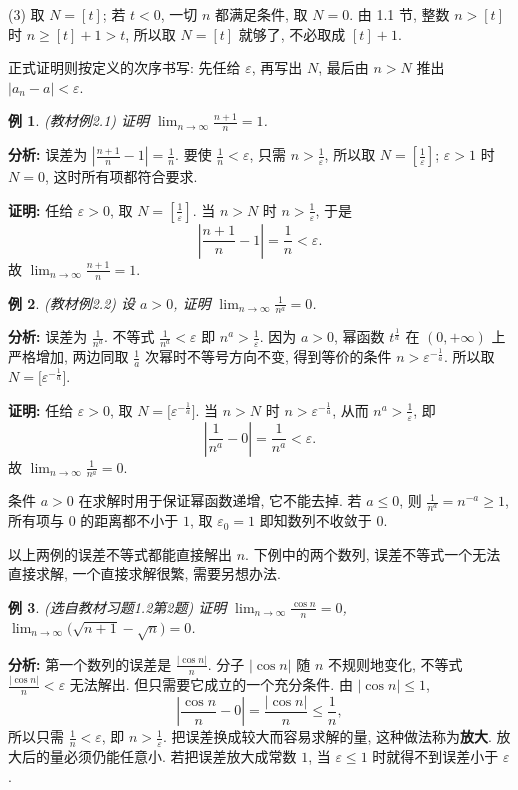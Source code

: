 \documentclass[UTF8,openany]{ctexbook}
\theoremstyle{chinesetextbook}
\newtheorem{example}{例}[section]
\newenvironment{cnproof}{\par\indent\textbf{证明:} \ignorespaces}{\par}
\begin{document}
(3) 取 $N=[t]$; 若 $t<0$, 一切 $n$ 都满足条件, 取 $N=0$. 由 1.1 节, 整数 $n>[t]$ 时 $n\ge[t]+1>t$, 所以取 $N=[t]$ 就够了, 不必取成 $[t]+1$.

正式证明则按定义的次序书写: 先任给 $\varepsilon$, 再写出 $N$, 最后由 $n>N$ 推出 $|a_n-a|<\varepsilon$.
\begin{example}\label{ex:2-1}
\textnormal{(教材例2.1)} 证明 $\displaystyle\lim_{n\to\infty}\frac{n+1}n=1$.
\end{example}
\par\indent\textbf{分析:} 误差为 $\displaystyle\left|\frac{n+1}n-1\right|=\frac1n$. 要使 $\displaystyle\frac1n<\varepsilon$, 只需 $\displaystyle n>\frac1\varepsilon$, 所以取 $\displaystyle N=\left[\frac1\varepsilon\right]$; $\varepsilon>1$ 时 $N=0$, 这时所有项都符合要求.
\begin{cnproof}
任给 $\varepsilon>0$, 取 $\displaystyle N=\left[\frac1\varepsilon\right]$. 当 $n>N$ 时 $\displaystyle n>\frac1\varepsilon$, 于是
\[
\left|\frac{n+1}n-1\right|=\frac1n<\varepsilon.
\]
故 $\displaystyle\lim_{n\to\infty}\frac{n+1}n=1$.
\end{cnproof}
\begin{example}\label{ex:2-2}
\textnormal{(教材例2.2)} 设 $a>0$, 证明 $\displaystyle\lim_{n\to\infty}\frac1{n^a}=0$.
\end{example}
\par\indent\textbf{分析:} 误差为 $\displaystyle\frac1{n^a}$. 不等式 $\displaystyle\frac1{n^a}<\varepsilon$ 即 $\displaystyle n^a>\frac1\varepsilon$. 因为 $a>0$, 幂函数 $t^{\frac1a}$ 在 $(0,+\infty)$ 上严格增加, 两边同取 $\displaystyle\frac1a$ 次幂时不等号方向不变, 得到等价的条件 $n>\varepsilon^{-\frac1a}$. 所以取 $N=\bigl[\varepsilon^{-\frac1a}\bigr]$.
\begin{cnproof}
任给 $\varepsilon>0$, 取 $N=\bigl[\varepsilon^{-\frac1a}\bigr]$. 当 $n>N$ 时 $n>\varepsilon^{-\frac1a}$, 从而 $\displaystyle n^a>\frac1\varepsilon$, 即
\[
\left|\frac1{n^a}-0\right|=\frac1{n^a}<\varepsilon.
\]
故 $\displaystyle\lim_{n\to\infty}\frac1{n^a}=0$.
\end{cnproof}
条件 $a>0$ 在求解时用于保证幂函数递增, 它不能去掉. 若 $a\le0$, 则 $\displaystyle\frac1{n^a}=n^{-a}\ge1$, 所有项与 $0$ 的距离都不小于 $1$, 取 $\varepsilon_0=1$ 即知数列不收敛于 $0$.

以上两例的误差不等式都能直接解出 $n$. 下例中的两个数列, 误差不等式一个无法直接求解, 一个直接求解很繁, 需要另想办法.
\begin{example}\label{ex:h12-2}
\textnormal{(选自教材习题1.2第2题)} 证明 $\displaystyle\lim_{n\to\infty}\frac{\cos n}n=0$, $\displaystyle\lim_{n\to\infty}\bigl(\sqrt{n+1}-\sqrt n\bigr)=0$.
\end{example}
\par\indent\textbf{分析:} 第一个数列的误差是 $\displaystyle\frac{|\cos n|}n$. 分子 $|\cos n|$ 随 $n$ 不规则地变化, 不等式 $\displaystyle\frac{|\cos n|}n<\varepsilon$ 无法解出. 但只需要它成立的一个充分条件. 由 $|\cos n|\le1$,
\[
\left|\frac{\cos n}n-0\right|=\frac{|\cos n|}n\le\frac1n,
\]
所以只需 $\displaystyle\frac1n<\varepsilon$, 即 $\displaystyle n>\frac1\varepsilon$. 把误差换成较大而容易求解的量, 这种做法称为\textbf{放大}. 放大后的量必须仍能任意小. 若把误差放大成常数 $1$, 当 $\varepsilon\le1$ 时就得不到误差小于 $\varepsilon$.
\end{document}
